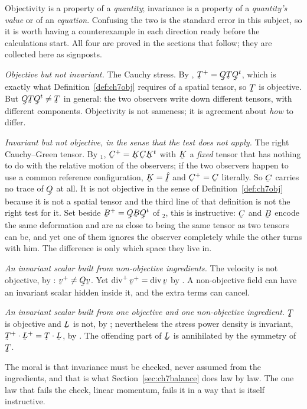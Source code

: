 \begin{remark}\label{rem:ch7objinv}
Objectivity is a property of a \emph{quantity}; invariance is a property
of a \emph{quantity's value} or of an \emph{equation}. Confusing the two
is the standard error in this subject, so it is worth having a
counterexample in each direction ready before the calculations start. All
four are proved in the sections that follow; they are collected here as
signposts.

\emph{Objective but not invariant.} The Cauchy stress. By ,
$\bT^{+}=\bQ\bT\bQ^{t}$, which is exactly what
Definition~\ref{def:ch7obj} requires of a spatial tensor, so $\bT$ is
objective. But $\bQ\bT\bQ^{t}\neq\bT$ in general: the two observers write
down different tensors, with different components. Objectivity is not
sameness; it is agreement about \emph{how} to differ.

\emph{Invariant but not objective, in the sense that the test does not
apply.} The right Cauchy--Green tensor. By $_{1}$,
$\bC^{+}=\bK\bC\bK^{t}$ with $\bK$ a \emph{fixed} tensor that has nothing
to do with the relative motion of the observers; if the two observers
happen to use a common reference configuration, $\bK=\hI$ and
$\bC^{+}=\bC$ literally. So $\bC$ carries no trace of $\bQ$ at all. It is
not objective in the sense of Definition~\ref{def:ch7obj} because it is
not a spatial tensor and the third line of that definition is not the
right test for it. Set beside $\bB^{+}=\bQ\bB\bQ^{t}$ of
$_{2}$, this is instructive: $\bC$ and $\bB$ encode the same
deformation and are as close to being the same tensor as two tensors can
be, and yet one of them ignores the observer completely while the other
turns with him. The difference is only which space they live in.

\emph{An invariant scalar built from non-objective ingredients.} The
velocity is not objective, by : $\bv^{+}\neq\bQ\bv$. Yet
$\dvg^{+}\bv^{+}=\dvg\bv$ by . A non-objective field can have
an invariant scalar hidden inside it, and the extra terms can cancel.

\emph{An invariant scalar built from one objective and one
non-objective ingredient.} $\bT$ is objective and $\bL$ is not, by
; nevertheless the stress power density is invariant,
$\bT^{+}\cdot\bL^{+}=\bT\cdot\bL$, by . The offending part of
$\bL$ is annihilated by the symmetry of $\bT$.

The moral is that invariance must be checked, never assumed from the
ingredients, and that is what Section~\ref{sec:ch7balance} does law by
law. The one law that fails the check, linear momentum, fails it in a way
that is itself instructive.
\end{remark}

